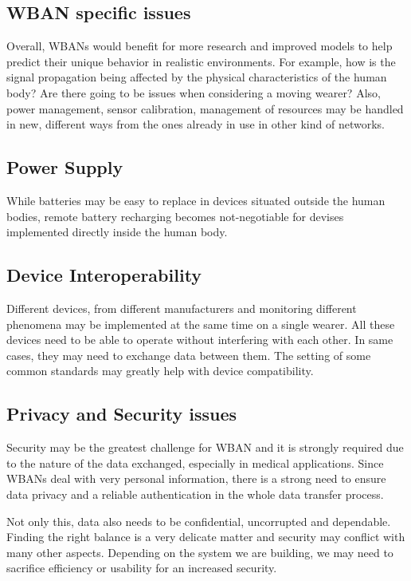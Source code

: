 \documentclass[conference]{IEEEtran}
\begin{document}
\subsection {WBAN specific issues}
Overall, WBANs would benefit for more research and improved models to help predict their unique behavior in realistic environments. For example, how is the signal propagation being affected by the physical characteristics of the human body? Are there going to be issues when considering a moving wearer? Also, power management, sensor calibration, management of resources may be handled in new, different ways from the ones already in use in other kind of networks.

\subsection {Power Supply}
While batteries may be easy to replace in devices situated outside the human bodies, remote battery recharging becomes not-negotiable for devises implemented directly inside the human body.

\subsection {Device Interoperability}
Different devices, from different manufacturers and monitoring different phenomena may be implemented at the same time on a single wearer. All these devices need to be able to operate without interfering with each other. In same cases, they may need to exchange data between them. The setting of some common standards may greatly help with device compatibility. 

\subsection {Privacy and Security issues}
Security may be the greatest challenge for WBAN and it is strongly required due to the nature of the data exchanged, especially in medical applications. Since WBANs deal with very personal information, there is a strong need to ensure data privacy and a reliable authentication in the whole data transfer process. 

Not only this, data also needs to be confidential, uncorrupted and dependable. Finding the right balance is a very delicate matter and security may conflict with many other aspects. Depending on the system we are building, we may need to sacrifice efficiency or usability for an increased security. 
\end{document}
